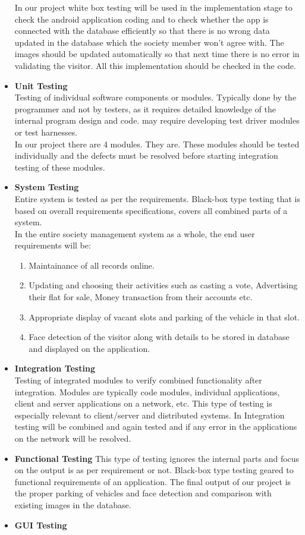 \begin{itemize}
In our project white box testing will be used in the implementation stage to check the android application coding and to check whether the app is connected with the database efficiently so that there is no wrong data updated in the database which the society member won’t agree with. The images should be updated automatically so that next time there is no error in validating the visitor. All this implementation should be checked in the code.




\item \textbf{Unit Testing}\\
Testing of individual software components or modules. Typically done by the programmer and not by testers, as it requires detailed knowledge of the internal program design and code. may require developing test driver modules or test harnesses.\\
In our project there are 4 modules. They are. These modules should be tested individually and the defects must be resolved before starting integration testing of these modules.


\item \textbf{System Testing}\\
Entire system is tested as per the requirements. Black-box type testing that is based on overall requirements specifications, covers all combined parts of a system.\\
   In the entire society management system as a whole, the end user requirements will be:
\begin{enumerate}
\item Maintainance of all records online.
\item Updating and choosing their activities such as casting a vote, Advertising their flat for sale, Money transaction from their accounts etc.
\item Appropriate display of vacant slots and parking of the vehicle in that slot.
\item Face detection of the visitor along with details to be stored in database and displayed on the application.
\end{enumerate}




\item \textbf{Integration Testing}\\
Testing of integrated modules to verify combined functionality after integration. Modules are typically code modules, individual applications, client and server applications on a network, etc. This type of testing is especially relevant to client/server and distributed systems. In Integration testing      will be combined and again tested and if any error in the applications on the network will be resolved.
\item \textbf{Functional Testing}
This type of testing ignores the internal parts and focus on the output is as per requirement or not. Black-box type testing geared to functional requirements of an application. The final output of our project is the proper parking of vehicles and face detection and comparison with existing images in the database.
\item \textbf{GUI Testing}


\end{itemize}
